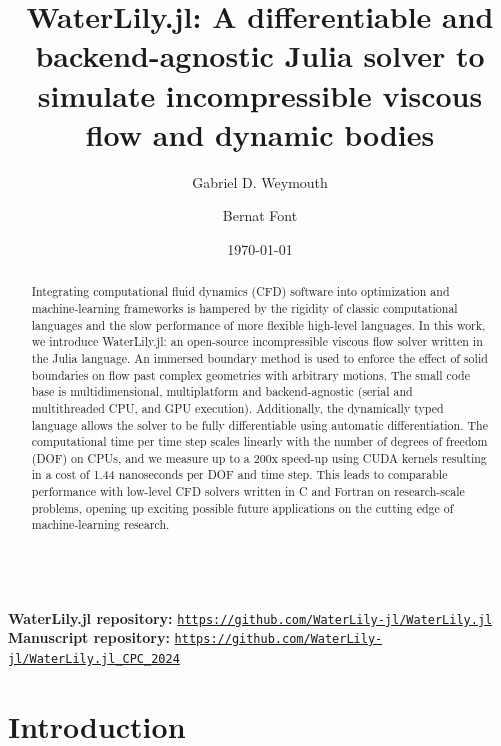 \documentclass[10pt,a4paper]{article}
\title{\textbf{WaterLily.jl: A differentiable and backend-agnostic Julia solver to simulate incompressible viscous flow and dynamic bodies}}
\author[1]{Gabriel D. Weymouth}
\author[1,2,\footnote{\href{mailto:b.font@tudelft.nl}{\texttt{b.font@tudelft.nl}}}]{Bernat Font}
\affil[1]{Faculty of Mechanical Engineering, Delft University of Technology, Delft, Netherlands}
\affil[2]{Barcelona Supercomputing Center, Barcelona, Spain}
\date{\today}
\begin{document}
{\let\newpage\relax\maketitle}
\setlength{\parindent}{0pt}
\setlength{\parskip}{8pt}

\date{\vspace{-20pt}}
\begin{abstract}
Integrating computational fluid dynamics (CFD) software into optimization and machine-learning frameworks is hampered by the rigidity of classic computational languages and the slow performance of more flexible high-level languages. In this work, we introduce WaterLily.jl: an open-source incompressible viscous flow solver written in the Julia language. An immersed boundary method is used to enforce the effect of solid boundaries on flow past complex geometries with arbitrary motions. The small code base is multidimensional, multiplatform and backend-agnostic (serial and multithreaded CPU, and GPU execution). Additionally, the dynamically typed language allows the solver to be fully differentiable using automatic differentiation. The computational time per time step scales linearly with the number of degrees of freedom (DOF) on CPUs, and we measure up to a 200x speed-up using CUDA kernels resulting in a cost of 1.44 nanoseconds per DOF and time step. This leads to comparable performance with low-level CFD solvers written in C and Fortran on research-scale problems, opening up exciting possible future applications on the cutting edge of machine-learning research.
\end{abstract}

\begin{small}
  \noindent
  \\
  \textbf{WaterLily.jl repository:} \href{https://github.com/WaterLily-jl/WaterLily.jl}{\texttt{https://github.com/WaterLily-jl/WaterLily.jl}}\\
  \textbf{Manuscript repository:} \href{https://github.com/WaterLily-jl/WaterLily.jl_CPC_2024}{\texttt{https://github.com/WaterLily-jl/WaterLily.jl\_CPC\_2024}}
\end{small}

\section{Introduction}
\end{document}
